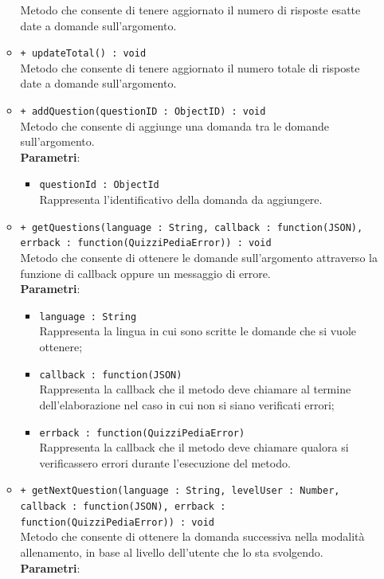 \begin{itemize}
\begin{itemize}
			Metodo che consente di tenere aggiornato il numero di risposte esatte date a domande sull'argomento.
			\item \texttt{+ updateTotal() : void} \\
			Metodo che consente di tenere aggiornato il numero totale di risposte date a domande sull'argomento.
			\item \texttt{+ addQuestion(questionID : ObjectID) : void} \\
			Metodo che consente di aggiunge una domanda tra le domande sull'argomento. \\
			\textbf{Parametri}:
			\begin{itemize}
			\item \texttt{questionId : ObjectId} \\
			Rappresenta l'identificativo della domanda da aggiungere.
			\end{itemize}
			\item \texttt{+ getQuestions(language : String, callback : function(JSON), errback : function(QuizziPediaError)) : void} \\
			Metodo che consente di ottenere le domande sull'argomento attraverso la funzione di callback oppure un messaggio di errore. \\
			\textbf{Parametri}:
			\begin{itemize}
			\item \texttt{language : String} \\
			Rappresenta la lingua in cui sono scritte le domande che si vuole ottenere;
			\item \texttt{callback : function(JSON)} \\
			Rappresenta la callback che il metodo deve chiamare al termine dell'elaborazione nel caso in cui non si siano verificati errori;
			\item \texttt{errback : function(QuizziPediaError)} \\
			Rappresenta la callback che il metodo deve chiamare qualora si verificassero errori durante l'esecuzione del metodo.
			\end{itemize}
			\item \texttt{+ getNextQuestion(language : String, levelUser : Number, callback : function(JSON), errback : function(QuizziPediaError)) : void} \\
			Metodo che consente di ottenere la domanda successiva nella modalità allenamento, in base al livello dell'utente che lo sta svolgendo. \\
			\textbf{Parametri}:
			\begin{itemize}

\end{itemize}
\end{itemize}
\end{itemize}
